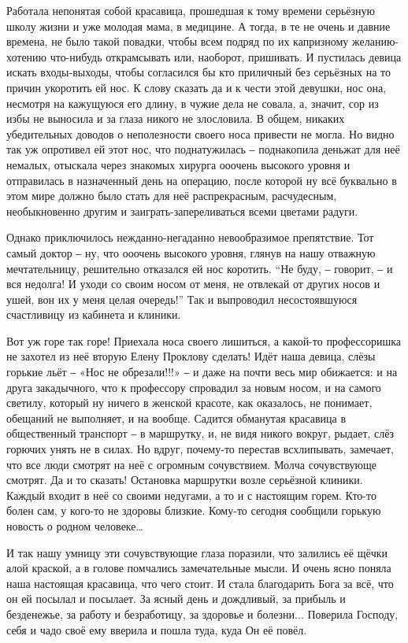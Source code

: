 Работала непонятая собой красавица, прошедшая к тому времени серьёзную школу
жизни и уже молодая мама, в медицине. А тогда, в те не очень и давние времена,
не было такой повадки, чтобы всем подряд по их капризному желанию-хотению
что-нибудь открамсывать или, наоборот, пришивать. И пустилась девица искать
входы-выходы, чтобы согласился бы кто приличный без серьёзных на то причин
укоротить ей нос. К слову сказать да и к чести этой девушки, нос она, несмотря
на кажущуюся его длину, в чужие дела не совала, а, значит, сор из избы не
выносила и за глаза никого не злословила. В общем, никаких убедительных доводов
о неполезности своего носа привести не могла.  Но видно так уж опротивел ей
этот нос, что поднатужилась ‒ поднакопила деньжат для неё немалых, отыскала
через знакомых хирурга ооочень высокого уровня и отправилась в назначенный день
на операцию, после которой ну всё буквально в этом мире должно было стать для
неё распрекрасным, расчудесным, необыкновенно другим и заиграть-запереливаться
всеми цветами радуги. 

Однако приключилось нежданно-негаданно невообразимое препятствие. Тот самый
доктор ‒ ну, что ооочень высокого уровня, глянув на нашу отважную
мечтательницу, решительно отказался ей нос коротить. \enquote{Не буду, ‒ говорит, ‒ и
вся недолга! И уходи со своим носом от меня, не отвлекай от других носов и
ушей, вон их у меня целая очередь!} Так и выпроводил несостоявшуюся счастливицу
из кабинета и клиники. 

Вот уж горе так горе! Приехала носа своего лишиться, а какой-то профессоришка
не захотел из неё вторую Елену Проклову сделать! Идёт наша девица, слёзы
горькие льёт ‒ «Нос не обрезали!!!» ‒ и даже на почти весь мир обижается: и на
друга закадычного, что к профессору спровадил за новым носом, и на самого
светилу, который ну ничего в женской красоте, как оказалось, не понимает,
обещаний не выполняет, и на вообще. Садится обманутая красавица в общественный
транспорт ‒ в маршрутку, и, не видя никого вокруг, рыдает, слёз горючих унять
не в силах. Но вдруг, почему-то перестав всхлипывать, замечает, что все люди
смотрят на неё с огромным сочувствием. Молча сочувствующе смотрят. Да и то
сказать! Остановка маршрутки возле серьёзной клиники. Каждый входит в неё со
своими недугами, а то и с настоящим горем. Кто-то болен сам, у кого-то не
здоровы близкие. Кому-то сегодня сообщили горькую новость о родном человеке…  

И так нашу умницу эти сочувствующие глаза поразили, что залились её щёчки алой
краской, а в голове помчались замечательные мысли. И очень ясно поняла наша
настоящая красавица, что чего стоит. И стала благодарить Бога за всё, что он ей
посылал и посылает. За ясный день и дождливый, за прибыль и безденежье, за
работу и безработицу, за здоровье и болезни... Поверила Господу, себя и чадо своё
ему вверила и пошла туда, куда Он её повёл. 

